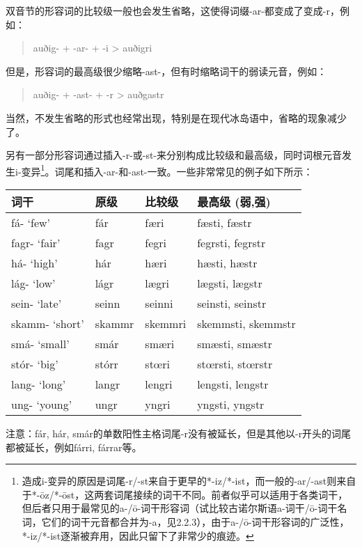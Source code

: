 双音节的形容词的比较级一般也会发生省略，这使得词缀-ar-都变成了变成-r，例如：

\begin{quote}
  auðig- + -ar- + -i \textgreater{} auðigri
\end{quote}

但是，形容词的最高级很少缩略-ast-，但有时缩略词干的弱读元音，例如：

\begin{quote}
  auðig- + -ast- + -r \textgreater{} auðgastr
\end{quote}

当然，不发生省略的形式也经常出现，特别是在现代冰岛语中，省略的现象减少了。

另有一部分形容词通过插入-r-或-st-来分别构成比较级和最高级，同时词根元音发生i-变异\footnote{造成i-变异的原因是词尾-r/-st来自于更早的*-iz/*-ist，而一般的-ar/-ast则来自于*-ōz/*-ōst，这两套词尾接续的词干不同。前者似乎可以适用于各类词干，但后者只用于最常见的a-/ō-词干形容词（试比较古诺尔斯语a-词干/ō-词干名词，它们的词干元音都合并为-a，见2.2.3），由于a-/ō-词干形容词的广泛性，*-iz/*-ist逐渐被弃用，因此只留下了非常少的痕迹。}。词尾和插入-ar-和-ast-一致。一些非常常见的例子如下所示：

\begin{longtable}{llll}
  \toprule
  词干             & 原级     & 比较级     & 最高级 (弱,强)          \\
  \midrule
  \endhead
  \bottomrule
  \endfoot
  fá- `few‌'      & fár    & færi    & fæsti, fæstr       \\
  fagr- `fair‌'   & fagr   & fegri   & fegrsti, fegrstr   \\
  há- `high‌'     & hár    & hæri    & hæsti, hæstr       \\
  lág- `low‌'     & lágr   & lægri   & lægsti, lægstr     \\
  sein- `late‌'   & seinn  & seinni  & seinsti, seinstr   \\
  skamm- `short‌' & skammr & skemmri & skemmsti, skemmstr \\
  smá- `small‌'   & smár   & smæri   & smæsti, smæstr     \\
  stór- `big‌'    & stórr  & stœri   & stœrsti, stœrstr   \\
  lang- `long‌'   & langr  & lengri  & lengsti, lengstr   \\
  ung- `young‌'   & ungr   & yngri   & yngsti, yngstr     \\
\end{longtable}

注意：fár, hár,
smár的单数阳性主格词尾-r没有被延长，但是其他以-r开头的词尾都被延长，例如fárri,
fárrar等。


